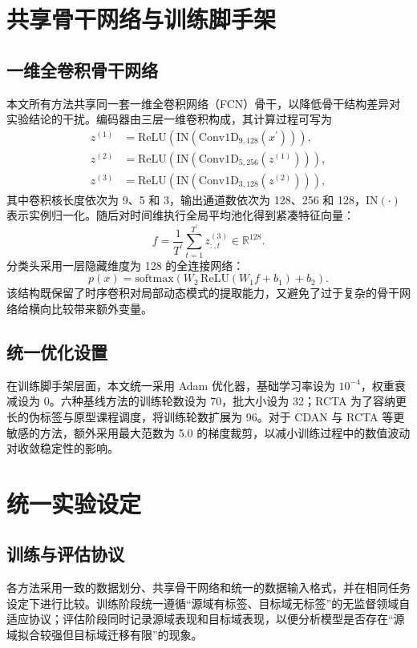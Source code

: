 \section{共享骨干网络与训练脚手架}
\subsection{一维全卷积骨干网络}
本文所有方法共享同一套一维全卷积网络（FCN）骨干，以降低骨干结构差异对实验结论的干扰。编码器由三层一维卷积构成，其计算过程可写为
\begin{align}
z^{(1)} &= \mathrm{ReLU}(\mathrm{IN}(\mathrm{Conv1D}_{9,128}(x^\prime))),\\
z^{(2)} &= \mathrm{ReLU}(\mathrm{IN}(\mathrm{Conv1D}_{5,256}(z^{(1)}))),\\
z^{(3)} &= \mathrm{ReLU}(\mathrm{IN}(\mathrm{Conv1D}_{3,128}(z^{(2)}))),
\end{align}
其中卷积核长度依次为 9、5 和 3，输出通道数依次为 128、256 和 128，$\mathrm{IN}(\cdot)$ 表示实例归一化。随后对时间维执行全局平均池化得到紧凑特征向量：
\begin{equation}
f=\frac{1}{T^\prime}\sum_{t=1}^{T^\prime} z^{(3)}_{:,t}\in\mathbb{R}^{128}.
\end{equation}
分类头采用一层隐藏维度为 128 的全连接网络：
\begin{equation}
p(x)=\mathrm{softmax}(W_2\,\mathrm{ReLU}(W_1 f+b_1)+b_2).
\end{equation}
该结构既保留了时序卷积对局部动态模式的提取能力，又避免了过于复杂的骨干网络给横向比较带来额外变量。

\subsection{统一优化设置}
在训练脚手架层面，本文统一采用 Adam 优化器，基础学习率设为 $10^{-4}$，权重衰减设为 0。六种基线方法的训练轮数设为 70，批大小设为 32；RCTA 为了容纳更长的伪标签与原型课程调度，将训练轮数扩展为 96。对于 CDAN 与 RCTA 等更敏感的方法，额外采用最大范数为 5.0 的梯度裁剪，以减小训练过程中的数值波动对收敛稳定性的影响。

\section{统一实验设定}
\subsection{训练与评估协议}
各方法采用一致的数据划分、共享骨干网络和统一的数据输入格式，并在相同任务设定下进行比较。训练阶段统一遵循“源域有标签、目标域无标签”的无监督领域自适应协议；评估阶段同时记录源域表现和目标域表现，以便分析模型是否存在“源域拟合较强但目标域迁移有限”的现象。


